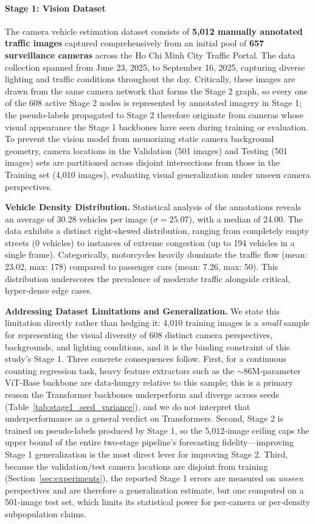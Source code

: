 \documentclass[journal,twocolumn]{IEEEtran}
\begin{document}
\paragraph{Stage 1: Vision Dataset}
The camera vehicle estimation dataset consists of \textbf{5,012 manually annotated traffic images} captured comprehensively from an initial pool of \textbf{657 surveillance cameras} across the Ho Chi Minh City Traffic Portal. The data collection spanned from June 23, 2025, to September 16, 2025, capturing diverse lighting and traffic conditions throughout the day. Critically, these images are drawn from the same camera network that forms the Stage 2 graph, so every one of the 608 active Stage 2 nodes is represented by annotated imagery in Stage 1; the pseudo-labels propagated to Stage 2 therefore originate from cameras whose visual appearance the Stage 1 backbones have seen during training or evaluation. To prevent the vision model from memorizing static camera background geometry, camera locations in the Validation (501 images) and Testing (501 images) sets are partitioned across disjoint intersections from those in the Training set (4,010 images), evaluating visual generalization under unseen camera perspectives.

\textbf{Vehicle Density Distribution.} Statistical analysis of the annotations reveals an average of 30.28 vehicles per image ($\sigma = 25.07$), with a median of 24.00. The data exhibits a distinct right-skewed distribution, ranging from completely empty streets (0 vehicles) to instances of extreme congestion (up to 194 vehicles in a single frame). Categorically, motorcycles heavily dominate the traffic flow (mean: 23.02, max: 178) compared to passenger cars (mean: 7.26, max: 50). This distribution underscores the prevalence of moderate traffic alongside critical, hyper-dense edge cases.

\textbf{Addressing Dataset Limitations and Generalization.} We state this limitation directly rather than hedging it: 4,010 training images is a \emph{small} sample for representing the visual diversity of 608 distinct camera perspectives, backgrounds, and lighting conditions, and it is the binding constraint of this study's Stage 1. Three concrete consequences follow. First, for a continuous counting regression task, heavy feature extractors such as the $\sim$86M-parameter ViT-Base backbone are data-hungry relative to this sample; this is a primary reason the Transformer backbones underperform and diverge across seeds (Table~\ref{tab:stage1_seed_variance}), and we do not interpret that underperformance as a general verdict on Transformers. Second, Stage 2 is trained on pseudo-labels produced by Stage 1, so the 5{,}012-image ceiling caps the upper bound of the entire two-stage pipeline's forecasting fidelity---improving Stage 1 generalization is the most direct lever for improving Stage 2. Third, because the validation/test camera locations are disjoint from training (Section~\ref{sec:experiments}), the reported Stage 1 errors are measured on \emph{unseen} perspectives and are therefore a generalization estimate, but one computed on a 501-image test set, which limits its statistical power for per-camera or per-density subpopulation claims.
\end{document}
